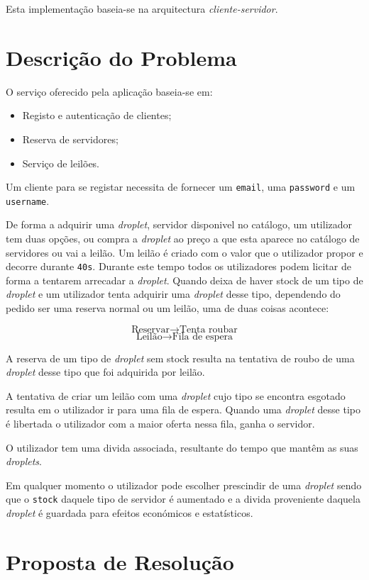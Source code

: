 \documentclass[a4paper]{article}
\begin{document}
Esta implementação baseia-se na arquitectura \textit{cliente-servidor}.


\section{Descrição do Problema}
O serviço oferecido pela aplicação baseia-se em:
\begin{itemize}
  \item Registo e autenticação de clientes;
  \item Reserva de servidores;
  \item Serviço de leilões.
\end{itemize}

Um cliente para se registar necessita de fornecer um \texttt{email}, uma \texttt{password} e um \texttt{username}. 

De forma a adquirir uma \textit{droplet}, servidor disponivel no catálogo, um utilizador tem duas opções, ou compra a \textit{droplet} ao preço a que esta aparece no catálogo de servidores ou vai a leilão. Um leilão é criado com o valor que o utilizador propor e decorre durante \texttt{40s}. Durante este tempo todos os utilizadores podem licitar de forma a tentarem arrecadar a \textit{droplet}.
Quando deixa de haver stock de um tipo de \textit{droplet} e um utilizador tenta adquirir uma \textit{droplet} desse tipo, dependendo do pedido ser uma reserva normal ou um leilão, uma de duas coisas acontece:

$$\textrm{Reservar} \rightarrow \textrm{Tenta roubar}$$
$$\textrm{Leilão} \rightarrow \textrm{Fila de espera}$$

A reserva de um tipo de \textit{droplet} sem stock resulta na tentativa de roubo de uma \textit{droplet} desse tipo que foi adquirida por leilão.

A tentativa de criar um leilão com uma \textit{droplet} cujo tipo se encontra esgotado resulta em o utilizador ir para uma fila de espera. Quando uma \textit{droplet} desse tipo é libertada o utilizador com a maior oferta nessa fila, ganha o servidor. 

O utilizador tem uma divida associada, resultante do tempo que mantêm as suas \textit{droplets}.

Em qualquer momento o utilizador pode escolher prescindir de uma \textit{droplet} sendo que o \texttt{stock} daquele tipo de servidor é aumentado e a divida proveniente daquela \textit{droplet} é guardada para efeitos económicos e estatísticos.

\section{Proposta de Resolução}
\end{document}
